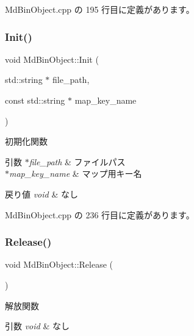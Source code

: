  Md\+Bin\+Object.\+cpp の 195 行目に定義があります。

\mbox{\label{class_md_bin_object_a10059d81505165733dd6d078c63667ac}} 
\subsubsection{\texorpdfstring{Init()}{Init()}}
{\footnotesize\ttfamily void Md\+Bin\+Object\+::\+Init (\begin{DoxyParamCaption}\item[{std\+::string $\ast$}]{file\+\_\+path,  }\item[{const std\+::string $\ast$}]{map\+\_\+key\+\_\+name }\end{DoxyParamCaption})}



初期化関数 


\begin{DoxyParams}{引数}
{\em $\ast$file\+\_\+path} & ファイルパス \\
\hline
{\em $\ast$map\+\_\+key\+\_\+name} & マップ用キー名 \\
\hline
\end{DoxyParams}

\begin{DoxyRetVals}{戻り値}
{\em void} & なし \\
\hline
\end{DoxyRetVals}


 Md\+Bin\+Object.\+cpp の 236 行目に定義があります。

\mbox{\label{class_md_bin_object_ab73761f64e78f0255baf056288df3ce7}} 
\subsubsection{\texorpdfstring{Release()}{Release()}}
{\footnotesize\ttfamily void Md\+Bin\+Object\+::\+Release (\begin{DoxyParamCaption}{ }\end{DoxyParamCaption})}



解放関数 


\begin{DoxyParams}{引数}
{\em void} & なし \\
\hline
\end{DoxyParams}


